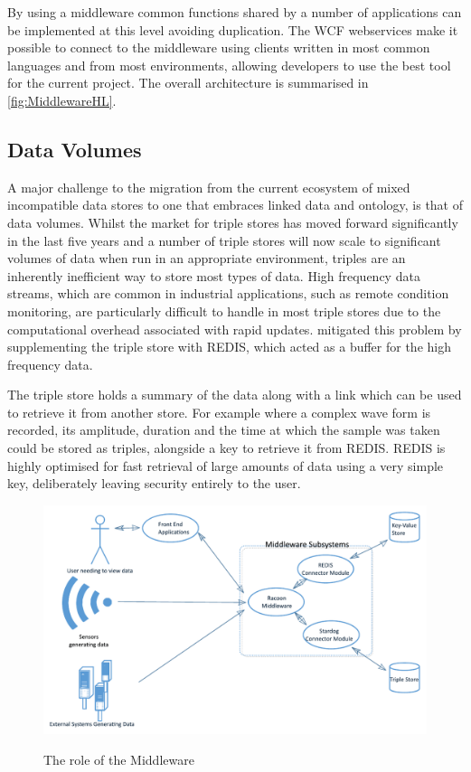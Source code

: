 By using a middleware common functions shared by a number of applications can be implemented at this level avoiding duplication. The WCF webservices make it possible to connect to the middleware using clients written in most common languages and from most environments, allowing developers to use the best tool for the current project. The overall architecture is summarised in \autoref{fig:MiddlewareHL}.

\subsection{Data Volumes}

A major challenge to the migration from the current ecosystem of mixed incompatible data stores to one that embraces linked data and ontology, is that of data volumes. Whilst the market for triple stores has moved forward significantly in the last five years and a number of triple stores will now scale to significant volumes of data when run in an appropriate environment, triples are an inherently inefficient way to store most types of data. High frequency data streams, which are common in industrial applications, such as remote condition monitoring, are particularly difficult to handle in most triple stores due to the computational overhead associated with rapid updates. \citet{Tutcher2015} mitigated this problem by supplementing the triple store with REDIS, which acted as a buffer for the high frequency data.

The triple store holds a summary of the data along with a link which can be used to retrieve it from another store. For example where a complex wave form is recorded, its amplitude, duration and the time at which the sample was taken could be stored as triples, alongside a key to retrieve it from REDIS. REDIS is highly optimised for fast retrieval of large amounts of data using a very simple key, deliberately leaving security entirely to the user.

 \begin{figure}[H]
\myfloatalign
{\includegraphics[width=\linewidth]{gfx/Middleware_role}} 
\caption{The role of the Middleware}
\label{fig:MiddlewareRole}
\end{figure}


